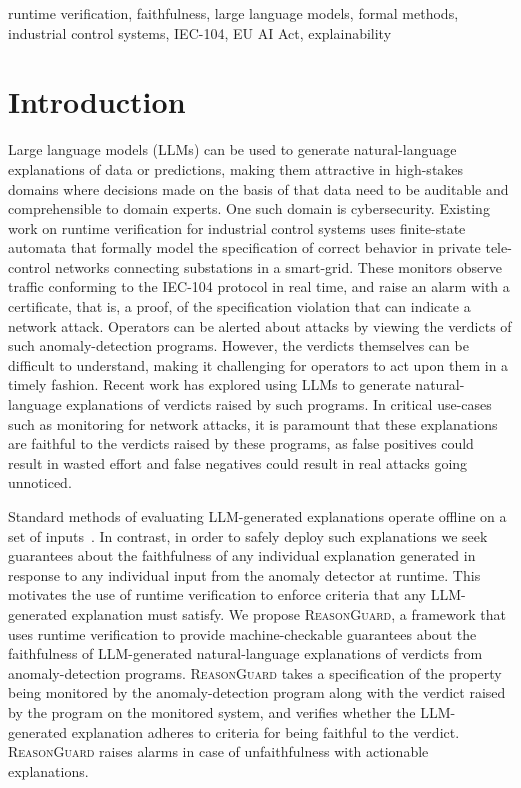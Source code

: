 \documentclass[conference]{IEEEtran}
\newcommand{\rg}{\textsc{ReasonGuard}}
\begin{document}
\begin{IEEEkeywords}
runtime verification, faithfulness, large language models, formal methods, industrial control systems, IEC-104, EU AI Act, explainability
\end{IEEEkeywords}

\section{Introduction}\label{sec:intro}

Large language models (LLMs) can be used to generate natural-language explanations of data or predictions, making them attractive in high-stakes domains where decisions made on the basis of that data need to be auditable and comprehensible to domain experts. One such domain is cybersecurity. Existing work on runtime verification for industrial control systems uses finite-state automata that formally model the specification of correct behavior in private tele-control networks connecting substations in a smart-grid. These monitors observe traffic conforming to the IEC-104 protocol in real time, and raise an alarm with a certificate, that is, a proof, of the specification violation that can indicate a network attack. Operators can be alerted about attacks by viewing the verdicts of such anomaly-detection programs. However, the verdicts themselves can be difficult to understand, making it challenging for operators to act upon them in a timely fashion. Recent work has explored using LLMs to generate natural-language explanations of verdicts raised by such programs. In critical use-cases such as monitoring for network attacks, it is paramount that these explanations are faithful to the verdicts raised by these programs, as false positives could result in wasted effort and false negatives could result in real attacks going unnoticed.

Standard methods of evaluating LLM-generated explanations operate offline on a set of inputs~\cite{Maynez2020Faithfulness,Min2023FActScore,Honovich2022True}. In contrast, in order to safely deploy such explanations we seek guarantees about the faithfulness of any individual explanation generated in response to any individual input from the anomaly detector at runtime. This motivates the use of runtime verification to enforce criteria that any LLM-generated explanation must satisfy. We propose \rg, a framework that uses runtime verification to provide machine-checkable guarantees about the faithfulness of LLM-generated natural-language explanations of verdicts from anomaly-detection programs. \rg{} takes a specification of the property being monitored by the anomaly-detection program along with the verdict raised by the program on the monitored system, and verifies whether the LLM-generated explanation adheres to criteria for being faithful to the verdict. \rg{} raises alarms in case of unfaithfulness with actionable explanations.
\end{document}
